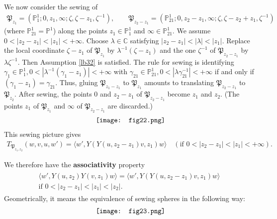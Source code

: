 \documentclass[12pt,a4paper,notitlepage]{article}
\theoremstyle{definition}
\theoremstyle{plain}
\newcommand{\fk}{\mathfrak}
\newcommand{\bk}[1]{\langle {#1}\rangle}
\newcommand{\Cbb}{\mathbb C}
\newcommand{\Pbb}{\mathbb P}
\numberwithin{equation}{section}
\begin{document}
\subsection{}\label{lb186}
We now consider the sewing of
\begin{gather*}
	\fk P_{z_1}=(\Pbb^1_1;0,z_1,\infty;\zeta,\zeta-z_1,\zeta^{-1}),\qquad \fk P_{z_2-z_1}=(\Pbb^1_{21};0,z_2-z_1,\infty;\zeta,\zeta-z_2+z_1,\zeta^{-1})	
\end{gather*}
(where $\Pbb^1_{21}=\Pbb^1$) along the points $z_1\in\Pbb^1_1$ and $\infty\in\Pbb^1_{21}$. We assume $0<|z_2-z_1|<|z_1|<+\infty$. Choose $\lambda\in\Cbb$ satisfying $|z_2-z_1|<|\lambda|<|z_1|$.  Replace the local coordinate $\zeta-z_1$ of $\fk P_{z_1}$ by $\lambda^{-1}(\zeta-z_1)$ and the one $\zeta^{-1}$ of $\fk P_{z_2-z_1}$ by $\lambda \zeta^{-1}$. Then Assumption \ref{lb32} is satisfied. The rule for sewing is identifying $\gamma_1\in \Pbb^1_1,0<|\lambda^{-1}(\gamma_1-z_1)|<+\infty$ with $\gamma_{21}\in\Pbb^1_{21},0<|\lambda\gamma_{21}^{-1}|<+\infty$ if and only if $(\gamma_1-z_1)=\gamma_{21}$. Thus, gluing $\fk P_{z_1-z_1}$ to $\fk P_{z_1}$ amounts to translating $\fk P_{z_2-z_1}$ to $\fk P_{z_2}$. After sewing, the points $0$ and $z_2-z_1$ of $\fk P_{z_2-z_1}$ become $z_1$ and $z_2$. (The points $z_1$ of $\fk P_{z_1}$ and $\infty$ of $\fk P_{z_2-z_1}$ are discarded.) 
\begin{align*}
	\vcenter{\hbox{{
				\texttt{[image: fig22.png]}}}}
\end{align*}
This sewing picture gives
\begin{align}
T_{\fk P_{z_1,z_2}}(w,v,u,w')=\bk{w',Y(Y(u,z_2-z_1)v,z_1)w}\quad(\text{if }0<|z_2-z_1|<|z_1|<+\infty).\label{eq45}	
\end{align}

We therefore have the \textbf{associativity} property
\begin{gather}\label{eq60}
\begin{gathered}
\bk{w',Y(u,z_2)Y(v,z_1)w}=\bk{w',Y(Y(u,z_2-z_1)v,z_1)w}\\
\text{if }0<|z_2-z_1|<|z_1|<|z_2|.
\end{gathered}	
\end{gather}
Geometrically, it means the equivalence of sewing spheres in the following way:
\begin{align*}
	\vcenter{\hbox{{
				\texttt{[image: fig23.png]}}}}
\end{align*}

\subsection{}\label{lb38}
\end{document}

